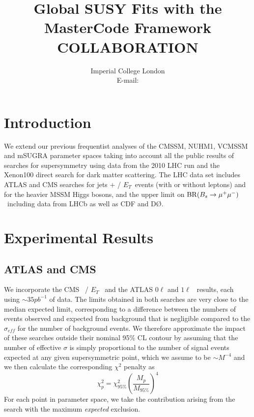 \documentclass[cits]{PoS}
\title{Global SUSY Fits with the MasterCode Framework COLLABORATION}
\author{\speaker{Samuel ROGERSON}%
        Imperial College London\\
        E-mail: \email{samr@cern.ch}}
\newcommand{\br}{{\rm BR}}
\newcommand{\bmm}{\ensuremath{\br(B_s \to \mu^+\mu^-)}\ }
\newcommand{\ETslash}{/ \hspace{-.8em}\ensuremath{E_T}\ }
\begin{document}
\section{Introduction}
We extend our previous\cite{mc5} frequentist analyses of the CMSSM, NUHM1, VCMSSM and mSUGRA parameter
spaces taking into account all the public results of searches for supersymmetry using data
from the 2010 LHC run and the Xenon100 direct search for dark matter scattering. The LHC 
data set includes ATLAS and CMS searches for jets $+$ \ETslash events (with or without 
leptons) and for the heavier MSSM Higgs bosons, and the upper limit on
\bmm including data from LHCb as well as CDF
and D\O .

\section{Experimental Results}
\subsection{ATLAS and CMS}
We incorporate the CMS~ \ETslash\cite{MHT} and the ATLAS $0\ell$ and $1\ell$~\cite{ATLAScombined}
results, each using $\sim 35pb^{-1}$ of data. The limits obtained
in both searches are very close to the median expected limit, corresponding 
to a difference between the numbers of events observed and expected from
background that is negligible compared to the $\sigma_{eff}$ for the number of 
background events. We therefore approximate the impact of these searches outside
their nominal 95\% CL contour by assuming that the number of effective $\sigma$ 
is simply proportional to the number of signal events expected at any given
supersymmetric point, which we assume to be $\sim M^{-4}$ and we then
calculate the corresponding $\chi^{2}$ penalty as
\begin{equation}
    \chi^{2}_{p} = \chi^{2}_{95\%}\left(\frac{M_{p}}{M_{95\%}}\right)^{4}
\end{equation}
For each point in parameter space, we take the contribution arising from the
search with the maximum \emph{expected} exclusion.
\end{document}
